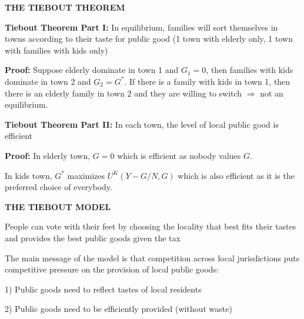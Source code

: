 \documentclass[landscape]{slides}
\begin{document}
\begin{slide}
\begin{center}
{\bf THE TIEBOUT  THEOREM}
\end{center}

\textbf{Tiebout Theorem Part I:} In equilibrium, families will sort themselves in towns
according to their taste for public good (1 town with elderly only, 1 town with
families with kids only)

\textbf{Proof:} Suppose elderly dominate in town 1 and $G_1=0$, then families with kids dominate in town 2
and $G_2=G^*$. If there is a family with kids in town 1, then there is an elderly
family in town 2 and they are willing to switch $\Rightarrow$ not an equilibrium.


\textbf{Tiebout Theorem Part II:} In each town, the level of local public good is efficient

\textbf{Proof:}  In elderly town, $G=0$ which is efficient as nobody values $G$.

In kids town, $G^*$ maximizes $U^K(Y-G/N,G)$ which is also efficient as it is the preferred
choice of everybody.


\end{slide}




\begin{slide}
\begin{center}
{\bf THE TIEBOUT MODEL}
\end{center}

People can vote with their feet by choosing the locality that best fits their tastes and provides the best
public goods given the tax

The main message of the model is that competition across local jurisdictions puts competitive pressure on the provision of local public goods:

1) Public goods need to reflect tastes of local residents

2) Public goods need to be efficiently provided (without waste)

\end{slide}
\end{document}
